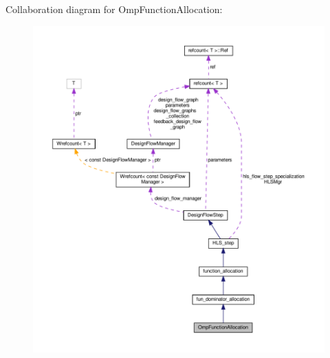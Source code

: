 Collaboration diagram for Omp\+Function\+Allocation\+:
\nopagebreak
\begin{figure}[H]
\begin{center}
\leavevmode
\includegraphics[width=350pt]{d1/dec/classOmpFunctionAllocation__coll__graph}
\end{center}
\end{figure}
